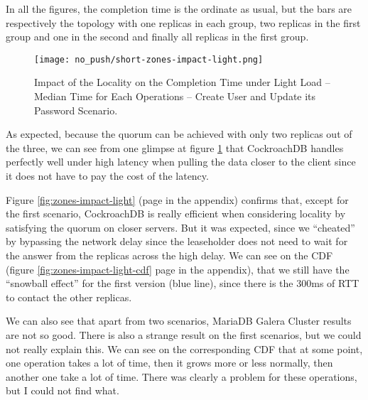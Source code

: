 In all the figures, the completion time is the ordinate as usual, but the bars are respectively the topology with one replicas in each group, two replicas in the first group and one in the second and finally all replicas in the first group.

\begin{figure}[H]
  \vspace{-10pt}
  \centering
  \centerline{\texttt{[image: no\_push/short-zones-impact-light.png]}}
  \vspace{-5pt}
  \caption{Impact of the Locality on the Completion Time under Light Load – Median Time for Each Operations – Create User and Update its Password Scenario.}
  \vspace{-5pt}
  \label{fig:short-zones-impact-light}
\end{figure}

As expected, because the quorum can be achieved with only two replicas out of the three, we can see from one glimpse at figure \ref{fig:short-zones-impact-light} that CockroachDB handles perfectly well under high latency when pulling the data closer to the client since it does not have to pay the cost of the latency.

Figure \ref{fig:zones-impact-light} (page \pageref{fig:zones-impact-light} in the appendix) confirms that, except for the first scenario, CockroachDB is really efficient when considering locality by satisfying the quorum on closer servers. But it was expected, since we ``cheated'' by bypassing the network delay since the leaseholder does not need to wait for the answer from the replicas across the high delay. We can see on the CDF (figure \ref{fig:zones-impact-light-cdf} page \pageref{fig:zones-impact-light-cdf} in the appendix), that we still have the ``snowball effect'' for the first version (blue line), since there is the 300ms of RTT to contact the other replicas.

We can also see that apart from two scenarios, MariaDB Galera Cluster results are not so good. There is also a strange result on the first scenarios, but we could not really explain this. We can see on the corresponding CDF that at some point, one operation takes a lot of time, then it grows more or less normally, then another one take a lot of time. There was clearly a problem for these operations, but I could not find what.
